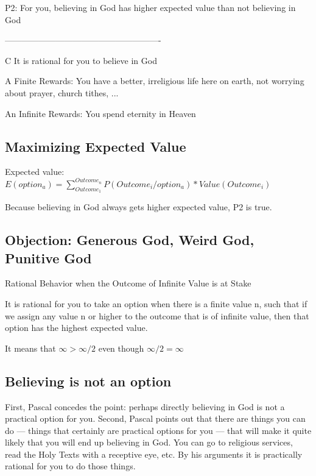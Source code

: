 \documentclass{article}
\begin{document}
P2: For you, believing in God has higher expected value than not believing in God

-------------------------------------------------------

C It is rational for you to believe in God


A Finite Rewards: You have a better, irreligious life here on earth, not worrying about prayer, church tithes, ...

An Infinite Rewards: You spend eternity in Heaven

\subsection{Maximizing Expected Value}

Expected value: $E(option_a) = \sum_{Outcome_1}^{Outcome_n} P (Outcome_i/ option_a)* Value(Outcome_i)$


Because believing in God always gets higher expected value, P2 is true.


\subsection{Objection: Generous God, Weird God, Punitive God }

Rational Behavior when the Outcome of Infinite Value is at Stake

It is rational for you to take an option when there is a finite value n, such that if we assign any value n or higher to the outcome that is of infinite value, then that option has the highest expected value.

It means that $\infty > \infty/2$ even though $\infty/2 = \infty$

\subsection{Believing is not an option}

First, Pascal concedes the point: perhaps directly believing in God is not a practical option for you. Second, Pascal points out that there are things you can do --- things that certainly are practical options for you --- that will make it quite likely that you will end up believing in God. You can go to religious services, read the Holy Texts with a receptive eye, etc. By his arguments it is practically rational for you to do those things.
\end{document}
